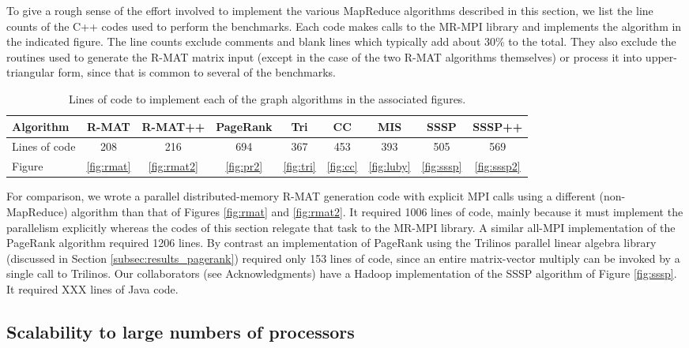 To give a rough sense of the effort involved to implement the various
MapReduce algorithms described in this section, we list the line
counts of the C++ codes used to perform the benchmarks.  Each code
makes calls to the MR-MPI library and implements the algorithm in the
indicated figure.  The line counts exclude comments and blank lines
which typically add about 30\% to the total.  They also exclude the
routines used to generate the R-MAT matrix input (except in the case
of the two R-MAT algorithms themselves) or process it into
upper-triangular form, since that is common to several of the
benchmarks.

\begin{table}
\begin{center}
\begin{tabular}{|l|c|c|c|c|c|c|c|c|}
\hline
Algorithm & R-MAT & R-MAT++ & PageRank & Tri & CC & MIS & SSSP & SSSP++ \\
\hline
Lines of code & 208 & 216 & 694 & 367 & 453 & 393 & 505 & 569 \\
Figure & \ref{fig:rmat} & \ref{fig:rmat2} & \ref{fig:pr2} & \ref{fig:tri} & \ref{fig:cc} & \ref{fig:luby} & \ref{fig:sssp} & \ref{fig:sssp2} \\
\hline
\end{tabular}
\caption{Lines of code to implement each of the graph
  algorithms in the associated figures.}
\label{t:rmat}
\end{center}
\end{table}

For comparison, we wrote a parallel distributed-memory R-MAT
generation code with explicit MPI calls using a different
(non-MapReduce) algorithm than that of Figures \ref{fig:rmat} and
\ref{fig:rmat2}.  It required 1006 lines of code, mainly because it
must implement the parallelism explicitly whereas the codes of this
section relegate that task to the MR-MPI library.  A similar all-MPI
implementation of the PageRank algorithm required 1206 lines.  By
contrast an implementation of PageRank using the Trilinos parallel
linear algebra library (discussed in Section
\ref{subsec:results_pagerank}) required only 153 lines of code, since
an entire matrix-vector multiply can be invoked by a single call to
Trilinos.  Our collaborators (see Acknowledgments) have a Hadoop
implementation of the SSSP algorithm of Figure \ref{fig:sssp}.  It
required XXX lines of Java code.

\subsection{Scalability to large numbers of processors}

